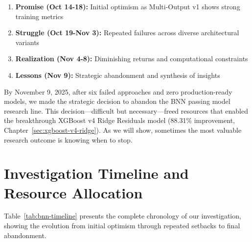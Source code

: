 \begin{enumerate}[itemsep=2pt,parsep=0pt]
    \item \textbf{Promise (Oct 14-18):} Initial optimism as Multi-Output v1 shows strong training metrics
    \item \textbf{Struggle (Oct 19-Nov 3):} Repeated failures across diverse architectural variants
    \item \textbf{Realization (Nov 4-8):} Diminishing returns and computational constraints
    \item \textbf{Lessons (Nov 9):} Strategic abandonment and synthesis of insights
\end{enumerate}

By November 9, 2025, after six failed approaches and zero production-ready models, we made the strategic decision to abandon the BNN passing model research line. This decision---difficult but necessary---freed resources that enabled the breakthrough XGBoost v4 Ridge Residuals model (88.31\% improvement, Chapter~\ref{sec:xgboost-v4-ridge}). As we will show, sometimes the most valuable research outcome is knowing when to stop.

\section{Investigation Timeline and Resource Allocation}

Table~\ref{tab:bnn-timeline} presents the complete chronology of our investigation, showing the evolution from initial optimism through repeated setbacks to final abandonment.

